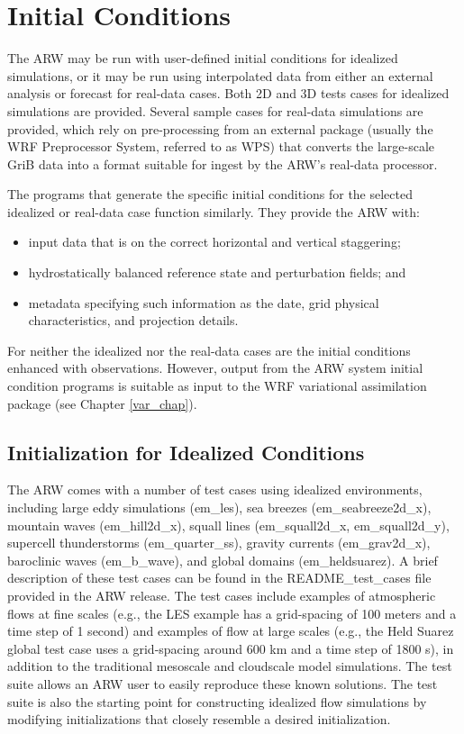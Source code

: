 \chapter{Initial Conditions}
\label{initialization_chap}

The ARW may be run with user-defined initial conditions 
for idealized simulations, or it may be run using
interpolated data from either an external analysis or forecast for
real-data cases.  Both 2D and 3D tests cases for idealized
simulations are provided.  
Several sample cases for real-data simulations are provided, which
rely on pre-processing from an external package (usually the 
WRF Preprocessor System, referred to as WPS) that converts
the large-scale GriB data into a format suitable for ingest by the ARW's
real-data processor.

The programs that generate the specific initial conditions for the selected 
idealized or real-data case function similarly. They provide the ARW with:
\begin{itemize}\setlength{\parskip}{-5pt}
\item input data that is on the correct horizontal and vertical staggering;
\item hydrostatically balanced reference state and perturbation fields; and
\item metadata specifying such information as the date, grid physical characteristics,
and projection details.
\end{itemize}
\noindent For neither the idealized nor the real-data cases
are the initial conditions enhanced with observations.  However, output from 
the ARW system initial condition programs is suitable as input to the WRF variational
assimilation package (see Chapter \ref{var_chap}).

\section{Initialization for Idealized Conditions}

The ARW comes with a number of test cases using idealized
environments, including large eddy simulations (em\_les),
sea breezes (em\_seabreeze2d\_x), mountain waves (em\_hill2d\_x), squall lines
(em\_squall2d\_x, em\_squall2d\_y), supercell thunderstorms
(em\_quarter\_ss), gravity currents (em\_grav2d\_x), baroclinic
waves (em\_b\_wave), and global domains (em\_heldsuarez).  
A brief description of these test cases can be
found in the README\_test\_cases file provided in the ARW release.
The test cases include examples of atmospheric
flows at fine scales (e.g., the LES example has a grid-spacing of
100 meters and a time step of 1 second) and examples of flow at large
scales (e.g., the Held Suarez global test case uses a grid-spacing around 600 km and
a time step of 1800 s), in addition to the traditional mesoscale and
cloudscale model simulations.  The test suite allows an ARW user to
easily reproduce these known solutions.  The test suite is also the
starting point for constructing idealized flow simulations by modifying
initializations that closely resemble a desired initialization.

